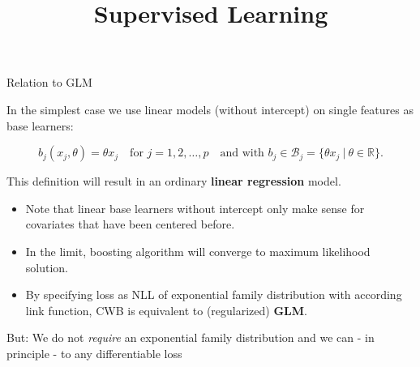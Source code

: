 \documentclass[11pt,compress,t,notes=noshow, xcolor=table]{beamer}
\title{Supervised Learning}\date{}
\begin{document}


\begin{vbframe}{Relation to GLM}

In the simplest case we use linear models (without intercept) on single features
as base learners:

$$
  b_j(x_j,\theta) = \theta x_j  \quad \text{for } j = 1, 2, \dots, p \quad
  \text{and with } b_j \in \mathcal{B}_j = \{\theta x_j  ~\rvert~ \theta \in
  \mathbb{R} \}.
$$


This definition will result in an ordinary \textbf{linear regression} model.



\begin{itemize}
  \item Note that linear base learners without intercept only make sense for
  covariates that have been centered before.
  \item In the limit, boosting algorithm will converge to maximum likelihood solution.
  \item By specifying loss as NLL of exponential family distribution with according link function, CWB is equivalent to (regularized) \textbf{GLM}.
\end{itemize}

\framebreak


But: We do not \emph{require} an exponential family distribution and we can - in principle - to any differentiable loss %


\end{vbframe}
\end{document}
